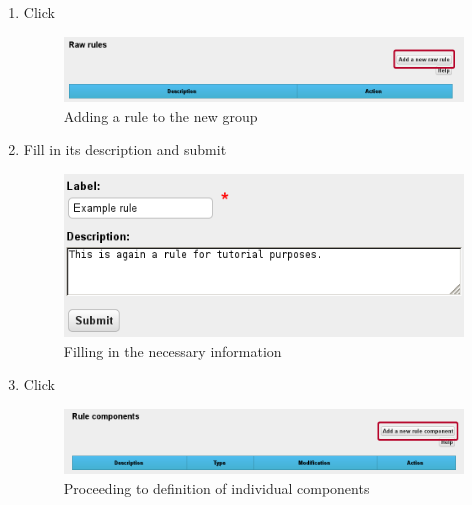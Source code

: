 \begin{enumerate}[resume]
\vspace*{0.2\textheight}

	\item Click 

\begin{figure}[!ht]
    \centering
    \includegraphics[width=\textwidth]{images/fe-walkthrough-add-raw-rule.png}
    \caption{Adding a rule to the new group}
	\label{fig:feWTAddRawRule}
\end{figure}
\FloatBarrier

\newpage

\vspace*{0.1\textheight}

	\item Fill in its description and submit

\begin{figure}[!ht]
    \centering
    \includegraphics[width=\textwidth]{images/fe-walkthrough-new-raw-rule.png}
    \caption{Filling in the necessary information}
	\label{fig:feWTNewRawRule}
\end{figure}
\FloatBarrier

\vspace*{0.2\textheight}

	\item Click 

\begin{figure}[!ht]
    \centering
    \includegraphics[width=\textwidth]{images/fe-walkthrough-add-component.png}
    \caption{Proceeding to definition of individual components}
	\label{fig:feWTAddComponent}
\end{figure}
\FloatBarrier


\end{enumerate}
